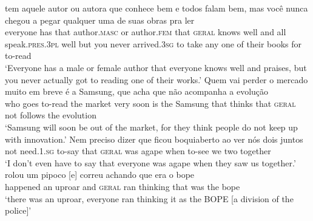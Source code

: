 \documentclass[output=paper]{langscibook}
\begin{document}
\ea\label{ex:avelar:23}
 \ea\label{ex:avelar:23a}
     tem   aquele  autor       ou   autora que  conhece   bem   e     todos  falam         bem, mas  você   nunca  chegou     a pegar   qualquer   uma de  suas   obras   pra   ler\\ %
         everyone     has   that   author.\textsc{masc} or   author.\textsc{fem} that   \textsc{geral}   knows   well   and  all     speak.\textsc{pres.3pl} well but   you   never   arrived.\textsc{3sg} to take   any     one of   their   books   for     to-read\\
  \glt ‘Everyone has a male or female author that everyone knows well and praises, but you never actually got to reading one of their works.’
  \ex\label{ex:avelar:23b}
   \gll Quem   vai   perder    o mercado     muito   {em breve}   é a Samsung, que   acha   que  não  acompanha   a evolução\\ %
         who   goes   to-read    the market   very   soon     is   the Samsung that  thinks that   \textsc{geral} not    follows     the evolution\\
  \glt ‘Samsung will soon be out of the market, for they think people do not keep up with innovation.’
\z 
\z 
\ea\label{ex:avelar:24}
 \ea\label{ex:avelar:24a}
  \gll Nem   preciso   dizer   que  ficou   boquiaberto ao     ver   nós dois   juntos \\ %
         not   need.\textsc{1.sg} to-say  that   \textsc{geral}  was   agape when   to-see   we two   together\\
 \glt ‘I don’t even have to say that everyone was agape when they saw us together.’
  \ex\label{ex:avelar:24b}
   \gll rolou     um pipoco   [e]  correu achando   que  era   o   bope\\ %
         happened   an   uproar   and   \textsc{geral}   ran thinking   that   was   the  bope\\
  \glt ‘there was an uproar, everyone ran thinking it as the BOPE [a division of the police]’
\z
\z 
\end{document}

